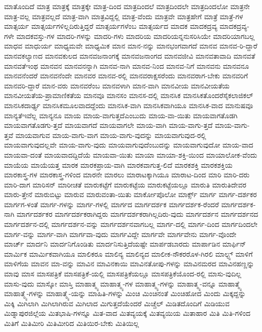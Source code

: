 {ಮಾತೊಂದಿದೆ
ಮಾತ್ರ
ಮಾತ್ರಕ್ಕೆ
ಮಾತ್ರಕ್ಕೇ
ಮಾತ್ರ-ದಿಂದ
ಮಾತ್ರದಿಂದಲೆ
ಮಾತ್ರದಿಂದಲೇ
ಮಾತ್ರದಿಂದಲೋ
ಮಾತ್ರನೇ
ಮಾತ್ರ-ವಲ್ಲ
ಮಾತ್ರವಲ್ಲದೆ
ಮಾತ್ರ-ವಾಗಿ
ಮಾತ್ರವಿದ್ದಲ್ಲಿ
ಮಾತ್ರ-ವೆಂದು
ಮಾತ್ರವೇ
ಮಾತ್ರಹೇಗೆ
ಮಾತ್ರೆ
ಮಾತ್ರೆ-ಗಳ
ಮಾತ್ಸರ್ಯ
ಮಾತ್ಸರ್ಯಗಳಿಲ್ಲದಿರುತ್ತಿದ್ದರೆ
ಮಾತ್ಸರ್ಯಗಳೆಂಬ
ಮಾತ್ಸರ್ಯದ
ಮಾದಕ
ಮಾದಕದ್ರವ್ಯ
ಮಾದಕದ್ರವ್ಯ-ಗಳೇ
ಮಾದಕವಸ್ತು-ಗಳ
ಮಾದರಿ-ಗಳನ್ನು
ಮಾದರಿ-ಗಳು
ಮಾದರಿಯ
ಮಾದರಿಯನ್ನನುಸರಿಸಿಯೇ
ಮಾದರಿಯಾಗಬಲ್ಲ
ಮಾಧವ
ಮಾಧುರ್ಯ
ಮಾಧ್ಯಮವೇ
ಮಾಧ್ಯಮಿಕ
ಮಾನ
ಮಾನ-ನನ್ನು
ಮಾನಭಂಗವಾಗದೆ
ಮಾನವ
ಮಾನವ-ರಿ-ದ್ದಾರೆ
ಮಾನವಕಲ್ಯಾಣದ
ಮಾನವಕುಲದ
ಮಾನವಜನಾಂಗಕ್ಕೆ
ಮಾನವಜನಾಂಗದ
ಮಾನವಜೀವಿ
ಮಾನವತಾವಾದಿ
ಮಾನವತೆ
ಮಾನವತೆಇಂಥ
ಮಾನವನ
ಮಾನವನನ್ನಾಗಿ
ಮಾನವ-ನಾಗಿ
ಮಾನವ-ನಿಂದ
ಮಾನವ-ನಿಗೆ
ಮಾನವನು
ಮಾನವನೂ
ಮಾನವನೆಂದರೆ
ಮಾನವನೆಂದೇ
ಮಾನವರ
ಮಾನವ-ರಲ್ಲಿ
ಮಾನವರಾಕ್ಷಸರೆಂದು
ಮಾನವರಾಗ-ಬೇಕು
ಮಾನವರಿಗೆ
ಮಾನವರಿ-ದ್ದಾರೆ
ಮಾನ-ವರು
ಮಾನವರೆಂಬ
ಮಾನವಳಾಗಿ
ಮಾನ-ವಾಗಿ
ಮಾನವೀಯ
ಮಾನವೀಯತೆಯ
ಮಾನವೀಯತೆಯ-ಪ್ರಾಮಾಣಿಕತೆಯ
ಮಾನವೂ
ಮಾನಸಂ
ಮಾನಸ-ದಲ್ಲಿ
ಮಾನಸಿಕ
ಮಾನಸಿಕತೊಂದರೆಸೈಕಲಾಜಿಕಲ್
ಮಾನಸಿಕದಾರ್ಢ್ಯ
ಮಾನಸಿಕಮೂಲವಾದದ್ದೆಂದು
ಮಾನಸಿಕ-ವಾಗಿ
ಮಾನಸಿಕವಾಗಿಯೂ
ಮಾನಸಿಕ-ವಾದ
ಮಾನುಷವೂ
ಮಾನ್ಯತೆಇವೆಲ್ಲ
ಮಾನ್ಯನೂ
ಮಾಯ
ಮಾಯ-ವಾಗುತ್ತದೆಎಂಬುದು
ಮಾಯ-ವಾ-ಯಿತು
ಮಾಯವಾಗತೊಡಗಿ
ಮಾಯವಾಗತೊಡಗು-ತ್ತದೆ
ಮಾಯವಾಗದೆ
ಮಾಯವಾಗಲೇ
ಮಾಯ-ವಾಗಿ
ಮಾಯ-ವಾಗು-ತ್ತದೆ
ಮಾಯ-ವಾಗು-ತ್ತವೆ
ಮಾಯವಾಗುವ
ಮಾಯ-ವಾಗು-ವಾಗ
ಮಾಯ-ವಾಗು-ವುದನ್ನು
ಮಾಯವಾಗುವುದ-ರಲ್ಲಿ
ಮಾಯವಾಗುವುದಲ್ಲವೇ
ಮಾಯ-ವಾಗು-ವುದು
ಮಾಯವಾಗುವುದೆಂಬುದನ್ನು
ಮಾಯವಾಗುವುದೋ
ಮಾಯ-ವಾದ
ಮಾಯವಾ-ದಂತೆ
ಮಾಯವಾದದ್ದಿದೆಯೆ
ಮಾಯವಾ-ಯಿತು
ಮಾಯಾ
ಮಾಯಾ-ಶಕ್ತಿ-ಯಿಂದ
ಮಾಯಾಲೋಕ-ವೆಂದು
ಮಾಯೆಯ
ಮಾಯೆಯತ್ತ
ಮಾರಕ
ಮಾರಕಪ್ರಾಯ-ವಾಗಿ
ಮಾರಕವಾಗುತ್ತ-ಲಿದೆ
ಮಾರಕಶಕ್ತಿ
ಮಾರಕಶಕ್ತಿಯ
ಮಾರಕಾಸ್ತ್ರ-ಗಳ
ಮಾರಕಾಸ್ತ್ರ-ಗಳಿಂದ
ಮಾರನೇ
ಮಾರಲು
ಮಾರಾಟಕ್ಕಾಗಿಯೂ
ಮಾರಾಟ-ದಿಂದ
ಮಾರಿ
ಮಾರಿ-ದರು
ಮಾರಿ-ದಾಗ
ಮಾರಿಸನ್
ಮಾರೀಚತೆ
ಮಾರುಕಟ್ಟೆಗೆ
ಮಾರುಕಟ್ಟೆಯ
ಮಾರುಕಟ್ಟೆಯಲ್ಲೂ
ಮಾರುತಿ
ಮಾರುತಿದೇವರ
ಮಾರು-ತ್ತೇನೆ
ಮಾರುಬಿಟ್ಟು
ಮಾರುವ
ಮಾರುವಂತಾ-ಯಿತು
ಮಾರ್ಕೋಪೊಲೋ
ಮಾರ್ಕ್ಸ್
ಮಾರ್ಗ
ಮಾರ್ಗ-ದರ್ಶಕರ
ಮಾರ್ಗಗ-ಳಂತೆ
ಮಾರ್ಗ-ಗಳನ್ನು
ಮಾರ್ಗ-ಗಳಲ್ಲಿ
ಮಾರ್ಗದ
ಮಾರ್ಗದರ್ಶಕ
ಮಾರ್ಗದರ್ಶಕ-ರೆಂದರೆ
ಮಾರ್ಗದರ್ಶಕ-ನಾಗಿ
ಮಾರ್ಗದರ್ಶಕರ
ಮಾರ್ಗದರ್ಶಕರಾಗಿದ್ದರು
ಮಾರ್ಗದರ್ಶಕರಾಗಿಲ್ಲದಿರು-ವುದು
ಮಾರ್ಗದರ್ಶನ
ಮಾರ್ಗದರ್ಶನದ
ಮಾರ್ಗದರ್ಶನ-ದಲ್ಲಿ
ಮಾರ್ಗದರ್ಶನ-ವನ್ನು
ಮಾರ್ಗದರ್ಶನವಾಗಬಲ್ಲ
ಮಾರ್ಗ-ದಲ್ಲಿ
ಮಾರ್ಗ-ದಿಂದ
ಮಾರ್ಗದಿಂದಲೇ
ಮಾರ್ಗ-ವನ್ನು
ಮಾರ್ಗ-ವಾಗಿ
ಮಾರ್ಗವಾ-ವುದು
ಮಾರ್ಗವಿದ್ದೇ
ಮಾರ್ಗವೇ
ಮಾರ್ಗವೇನು
ಮಾರ್ಗ-ವೊಂದೇ
ಮಾರ್ಚ್
ಮಾರ್ದನಿ
ಮಾರ್ದನಿಗೊಂಡಿತು
ಮಾರ್ದನಿಸುತ್ತಿದೆಯಷ್ಟೇ
ಮಾರ್ಪಡಬಾರದು
ಮಾರ್ಪಾಡಿನ
ಮಾರ್ಫಿನ್
ಮಾರ್ಮಿಕ
ಮಾರ್ಮಿಕವಾಗಿಯೂ
ಮಾಲಿಕರೂ
ಮಾಲಿನ್ಯ
ಮಾಲಿನ್ಯದ
ಮಾಲೀಕ-ನೌಕರರೊಳ-ಗಿರಲಿ
ಮಾಲ್ಟ್ಸ್
ಮಾಳಿಗೆ
ಮಾಳಿಗೆಯ
ಮಾವನ
ಮಾ-ವನ್ನು
ಮಾವಿನ
ಮಾವಿನಕಾಯಿ
ಮಾವಿನತೋಪು-ಗಳನ್ನು
ಮಾವಿನಮರದ
ಮಾವಿನಹಣ್ಣನ್ನು
ಮಾವು
ಮಾಸ
ಮಾಸಪತ್ರಿಕೆ
ಮಾಸಪತ್ರಿಕೆ-ಯಲ್ಲಿ
ಮಾಸಪತ್ರಿಕೆಯಲ್ಲೂ
ಮಾಸಪತ್ರಿಕೆಯೊಂದ-ರಲ್ಲಿ
ಮಾಸು-ವುದಿಲ್ಲ
ಮಾಸು-ವುದು
ಮಾಸ್ಕೋ
ಮಾಸ್ತಿ
ಮಾಹಾತ್ಮ್ಯ
ಮಾಹಾತ್ಮ್ಯ-ಗಳ
ಮಾಹಾತ್ಮ್ಯ-ಗಳನ್ನು
ಮಾಹಾತ್ಮ್ಯ-ವನ್ನೂ
ಮಾಹಾತ್ಮ್ಯೆ
ಮಾಹಾತ್ಮ್ಯೆ-ಗಳನ್ನು
ಮಾಹಾತ್ಮ್ಯೆ-ಯನ್ನು
ಮಾಹಿತಿ-ಗಳನ್ನು
ಮಿಂಚಿ
ಮಿಂಚಿನಂತೆ
ಮಿಂಚಿಹೋದ
ಮಿಂದು
ಮಿಕ್ಕದ್ದನ್ನು
ಮಿಕ್ಕಿ
ಮಿಗಿಲಾಗಿ
ಮಿಗಿಲಾಗಿರುವ
ಮಿಗಿಲಾದ
ಮಿಗುತ್ತದೆಯೆಂದರೆ
ಮಿಚ್ಚೆಲ್
ಮಿಡಿತದೊಂದಿಗೆ
ಮಿಡಿಯುವ
ಮಿಡ್ನಾಪುರಜಿಲ್ಲೆಯ
ಮಿತಭಾಷಿ-ಗಳನ್ನೂ
ಮಿತ-ವಾದ
ಮಿತವ್ಯಯಕ್ಕೆ
ಮಿತವ್ಯಯಿಯ
ಮಿತಾಹಾರ
ಮಿತಿ
ಮಿತಿ-ಗಳಿಂದ
ಮಿತಿಗೆ
ಮಿತಿಮೀರಿ
ಮಿತಿಮೀರಿದ
ಮಿತಿಯಿರ-ಬೇಕು
ಮಿತಿಯಿಲ್ಲ
}

